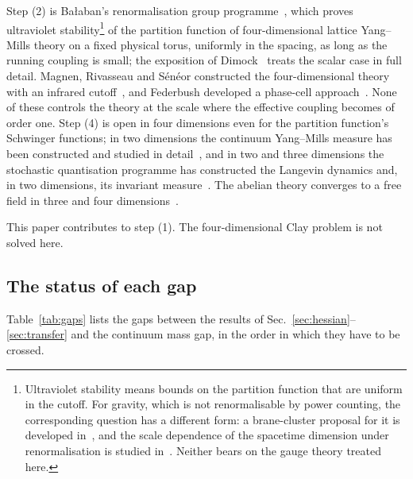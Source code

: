 \documentclass[aps,prd,twocolumn,superscriptaddress,nofootinbib,longbibliography,floatfix,amsmath,amssymb,10pt]{revtex4-2}
\theoremstyle{definition}
\theoremstyle{remark}
\begin{document}
Step (2) is Ba{\l}aban's renormalisation group programme~\cite{Bal84a,Bal84b,
Bal85a,Bal85b,Bal87,Bal88b,Bal88,Bal89a,Bal89b}, which proves ultraviolet
stability\footnote{Ultraviolet stability means bounds on the partition
function that are uniform in the cutoff. For gravity, which is not
renormalisable by power counting, the corresponding question has a different
form: a brane-cluster proposal for it is developed in~\cite{BSS26}, and the
scale dependence of the spacetime dimension under renormalisation is studied
in~\cite{SBG26}. Neither bears on the gauge theory treated here.} of the partition function of four-dimensional lattice Yang--Mills
theory on a fixed physical torus, uniformly in the spacing, as long as the
running coupling is small; the exposition of Dimock~\cite{Dim13a,Dim13b,
Dim13c} treats the scalar case in full detail. Magnen, Rivasseau and S\'en\'eor
constructed the four-dimensional theory with an infrared
cutoff~\cite{MRS93}, and Federbush developed a phase-cell
approach~\cite{Fed86,Fed88}. None of these controls the theory at the scale
where the effective coupling becomes of order one. Step (4) is open in four
dimensions even for the partition function's Schwinger functions; in two
dimensions the continuum Yang--Mills measure has been constructed and
studied in detail~\cite{Dri89,Sen97,Lev03}, and in two and three dimensions
the stochastic quantisation programme has constructed the Langevin dynamics
and, in two dimensions, its invariant measure~\cite{CCHS22,CCHS24,CS26}. The
abelian theory converges to a free field in three and four
dimensions~\cite{Gro83,Dri87}.

This paper contributes to step (1). The four-dimensional Clay problem is
not solved here.

\subsection{The status of each gap}

Table~\ref{tab:gaps} lists the gaps between the results of
Sec.~\ref{sec:hessian}--\ref{sec:transfer} and the continuum mass gap, in the
order in which they have to be crossed.
\end{document}
